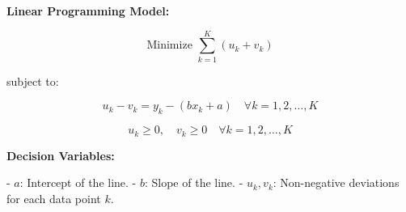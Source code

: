 \documentclass{article}
\begin{document}
\textbf{Linear Programming Model:}

\[
\text{Minimize } \sum_{k=1}^{K} (u_k + v_k)
\]

subject to:

\[
u_k - v_k = y_k - (bx_k + a) \quad \forall k = 1, 2, \ldots, K
\]

\[
u_k \geq 0, \quad v_k \geq 0 \quad \forall k = 1, 2, \ldots, K
\]

\textbf{Decision Variables:}

- \( a \): Intercept of the line.
- \( b \): Slope of the line.
- \( u_k, v_k \): Non-negative deviations for each data point \( k \).
\end{document}
